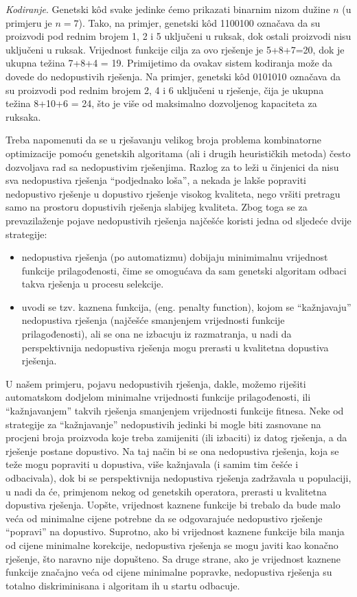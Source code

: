 \documentclass[a4paper, utf8, 11pt, colorlinks]{book}
\theoremstyle{definition}
\begin{document}
\emph{Kodiranje}. Genetski k\^od svake jedinke ćemo prikazati binarnim nizom dužine $n$ (u primjeru je $n=7$). Tako, na primjer, genetski k\^od 1100100 označava da su proizvodi pod rednim brojem 1, 2 i 5 uključeni u ruksak, dok ostali proizvodi nisu uključeni u ruksak. Vrijednost funkcije cilja za ovo rješenje je 5+8+7=20, dok je ukupna težina 7+8+4 = 19. 
Primijetimo da ovakav sistem kodiranja može da dovede do nedopustivih rješenja. Na primjer, genetski k\^od 0101010 označava da su proizvodi pod rednim brojem 2, 4 i 6 uključeni u rješenje, čija je ukupna težina 8+10+6 = 24, što je više od maksimalno dozvoljenog kapaciteta za ruksaka.

Treba napomenuti da se u rješavanju velikog broja problema kombinatorne optimizacije pomoću genetskih algoritama (ali i drugih heurističkih metoda) često dozvoljava rad sa nedopustivim rješenjima. Razlog za to leži u činjenici da nisu sva nedopustiva rješenja ``podjednako loša'', a nekada je lakše popraviti nedopustivo rješenje u dopustivo rješenje visokog kvaliteta, nego vršiti pretragu samo na prostoru dopustivih rješenja slabijeg kvaliteta.  Zbog toga se za prevazilaženje pojave nedopustivih rješenja najčešće koristi jedna od sljedeće dvije strategije: 
\begin{itemize}
	\item
	nedopustiva rješenja (po automatizmu) dobijaju minimimalnu vrijednost funkcije prilagođenosti, čime se omogućava da sam genetski algoritam odbaci takva rješenja u procesu selekcije. 
	
	\item uvodi se tzv. kaznena funkcija, (eng. penalty function), kojom se ``kažnjavaju'' nedopustiva rješenja (najčešće smanjenjem vrijednosti funkcije prilagođenosti), ali se ona ne izbacuju iz razmatranja, u nadi da perspektivnija nedopustiva rješenja mogu prerasti u kvalitetna dopustiva rješenja.
\end{itemize}

U našem primjeru, pojavu nedopustivih rješenja, dakle, možemo riješiti automatskom dodjelom minimalne vrijednosti funkcije prilagođenosti, ili ``kažnjavanjem'' takvih rješenja smanjenjem vrijednosti funkcije fitnesa. Neke od strategije za ``kažnjavanje'' nedopustivih jedinki bi mogle biti zasnovane na procjeni broja proizvoda koje treba zamijeniti (ili izbaciti) iz datog rješenja, a da rješenje postane dopustivo. Na taj način bi se ona nedopustiva rješenja, koja se teže mogu popraviti u dopustiva, više kažnjavala (i samim tim češće i odbacivala), dok bi se perspektivnija nedopustiva rješenja zadržavala u populaciji, u nadi da će, primjenom nekog od genetskih operatora, prerasti u kvalitetna dopustiva rješenja. Uopšte, vrijednost kaznene funkcije bi trebalo da bude malo veća od minimalne cijene potrebne da se odgovarajuće nedopustivo rješenje ``popravi'' na dopustivo. Suprotno, ako bi vrijednost kaznene funkcije bila manja od cijene minimalne korekcije, nedopustiva rješenja se mogu javiti kao konačno rješenje, što naravno nije dopušteno. Sa druge strane, ako je vrijednost kaznene funkcije značajno veća od cijene minimalne popravke, nedopustiva rješenja su totalno diskriminisana i algoritam ih u startu odbacuje. 
\end{document}
